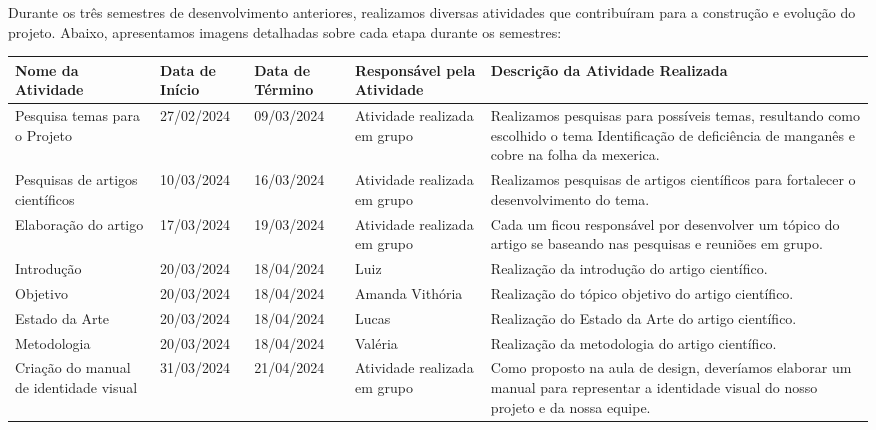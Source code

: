 Durante os três semestres de desenvolvimento anteriores, realizamos diversas
atividades que contribuíram para a construção e evolução do projeto. Abaixo,
apresentamos imagens detalhadas sobre cada etapa durante os semestres:

\begin{center}
\begin{adjustbox}{max width=\textwidth}
\begin{tabular}{|m{4cm}|m{2.5cm}|m{2.5cm}|m{3cm}|m{8cm}|}
\hline
\textbf{Nome da Atividade} &
\textbf{Data de Início} &
\textbf{Data de Término} &
\textbf{Responsável pela Atividade} &
\textbf{Descrição da Atividade Realizada} \\ \hline

Pesquisa temas para o Projeto & 27/02/2024 & 09/03/2024 & Atividade realizada em grupo &
Realizamos pesquisas para possíveis temas, resultando como escolhido o tema Identificação de deficiência de manganês e cobre na folha da mexerica. \\ \hline

Pesquisas de artigos científicos & 10/03/2024 & 16/03/2024 & Atividade realizada em grupo &
Realizamos pesquisas de artigos científicos para fortalecer o desenvolvimento do tema. \\ \hline

Elaboração do artigo & 17/03/2024 & 19/03/2024 & Atividade realizada em grupo &
Cada um ficou responsável por desenvolver um tópico do artigo se baseando nas pesquisas e reuniões em grupo. \\ \hline

Introdução & 20/03/2024 & 18/04/2024 & Luiz &
Realização da introdução do artigo científico. \\ \hline

Objetivo & 20/03/2024 & 18/04/2024 & Amanda Vithória &
Realização do tópico objetivo do artigo científico. \\ \hline

Estado da Arte & 20/03/2024 & 18/04/2024 & Lucas &
Realização do Estado da Arte do artigo científico. \\ \hline

Metodologia & 20/03/2024 & 18/04/2024 & Valéria &
Realização da metodologia do artigo científico. \\ \hline

Criação do manual de identidade visual & 31/03/2024 & 21/04/2024 & Atividade realizada em grupo &
Como proposto na aula de design, deveríamos elaborar um manual para representar a identidade visual do nosso projeto e da nossa equipe. \\ \hline


\end{tabular}
\end{adjustbox}
\end{center}
